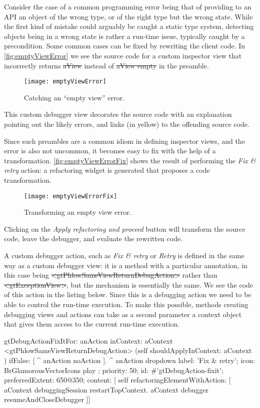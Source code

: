 \documentclass[sigplan,anonymous,review,10pt]{acmart}
\newcommand{\GT}{\lst{GT}\xspace} %
\begin{document}
Consider the case of a common programming error being that of providing to an API an object of the wrong type, or of the right type but the wrong state.
While the first kind of mistake could arguably be caught a static type system, detecting objects being in a wrong state is rather a run-time issue, typically caught by a precondition.
Some common cases can be fixed by rewriting the client code.
In \autoref{fig:emptyViewError} we see the source code for a custom inspector view that incorrectly returns \st{aView} instead of \st{aView empty} in the preamble.
\begin{figure}[h]
  \texttt{[image: emptyViewError]}
  \caption{Catching an ``empty view'' error.}
  \label{fig:emptyViewError}
\end{figure}
This custom debugger view decorates the source code with an explanation pointing out the likely errors, and links (in yellow) to the offending source code.

Since such preambles are a common idiom in defining \GT inspector views, and the error is also not uncommon, it becomes easy to fix with the help of a transformation.
\autoref{fig:emptyViewErrorFix} shows the result of performing the \emph{Fix \& retry} action: a refactoring widget is generated that proposes a code transformation.
\begin{figure*}[h]
  \texttt{[image: emptyViewErrorFix]}
  \caption{Transforming an empty view error.}
  \label{fig:emptyViewErrorFix}
\end{figure*}
Clicking on the \emph{Apply refactoring and proceed} button will transform the source code, leave the debugger, and evaluate the rewritten code.

A custom debugger action, such as \emph{Fix \& retry} or \emph{Retry} is defined in the same way as a custom debugger view: it is a method with a particular annotation, in this case being \st{<gtPhlowSameViewReturnDebugAction>} rather than \mbox{\st{<gtExceptionView>}}, but  the mechanism is essentially the same.
We see the code of this action in the listing below.
Since this is a debugging action we need to be able to control the run-time execution.
To make this possible, methods creating debugging views and actions can take as a second parameter a context object that gives them access to the current run-time execution.

\begin{code}
gtDebugActionFixItFor: anAction inContext: aContext
	<gtPhlowSameViewReturnDebugAction>
	(self shouldApplyInContext: aContext )
		ifFalse: [ ^ anAction noAction ].
	^ anAction dropdown
		label: 'Fix & retry';
		icon: BrGlamorousVectorIcons play ;
		priority: 50;
		id: #'gtDebugAction-fixit';
		preferredExtent: 650@350;
		content: [ self refactoringElementWithAction: [
			aContext debuggingSession restartTopContext.
			aContext debugger resumeAndCloseDebugger ]]
\end{code}
\end{document}
